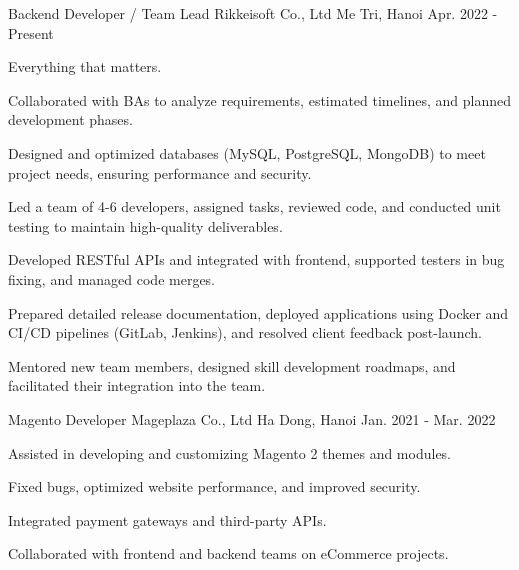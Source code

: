 

\begin{cventries}

  \cventry
    {Backend Developer / Team Lead} %
    {Rikkeisoft Co., Ltd} %
    {Me Tri, Hanoi} %
    {Apr. 2022 - Present} %
    {
      \begin{cvitems} %
        \item {Everything that matters.}
        \item {Collaborated with BAs to analyze requirements, estimated timelines, and planned development phases.}
        \item {Designed and optimized databases (MySQL, PostgreSQL, MongoDB) to meet project needs, ensuring performance and security.}
        \item {Led a team of 4-6 developers, assigned tasks, reviewed code, and conducted unit testing to maintain high-quality deliverables.}
        \item {Developed RESTful APIs and integrated with frontend, supported testers in bug fixing, and managed code merges.}
        \item {Prepared detailed release documentation, deployed applications using Docker and CI/CD pipelines (GitLab, Jenkins), and resolved client feedback post-launch.}
        \item {Mentored new team members, designed skill development roadmaps, and facilitated their integration into the team.}
      \end{cvitems}
    }

  \cventry
    {Magento Developer} %
    {Mageplaza Co., Ltd} %
    {Ha Dong, Hanoi} %
    {Jan. 2021 - Mar. 2022} %
    {
      \begin{cvitems} %
        \item {Assisted in developing and customizing Magento 2 themes and modules.}
        \item {Fixed bugs, optimized website performance, and improved security.}
        \item {Integrated payment gateways and third-party APIs.}
        \item {Collaborated with frontend and backend teams on eCommerce projects.}
      \end{cvitems}
    }

\end{cventries}
